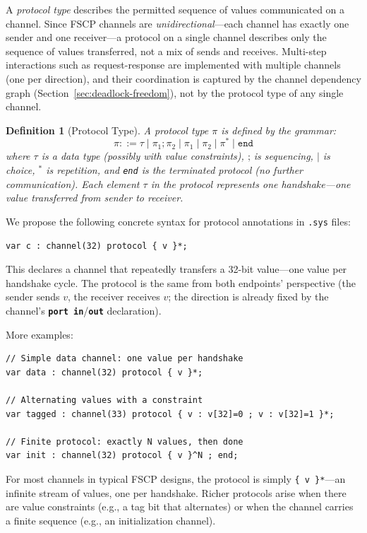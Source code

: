 \documentclass[11pt]{article}
\newcommand{\keyword}[1]{\texttt{\textbf{#1}}}
\newtheorem{definition}[theorem]{Definition}
\begin{document}
A \emph{protocol type} describes the permitted sequence of
values communicated on a channel.  Since FSCP channels are
\emph{unidirectional}---each channel has exactly one sender and one
receiver---a protocol on a single channel describes only the sequence
of values transferred, not a mix of sends and receives.  Multi-step
interactions such as request-response are implemented with multiple
channels (one per direction), and their coordination is captured by
the channel dependency graph (Section~\ref{sec:deadlock-freedom}),
not by the protocol type of any single channel.

\begin{definition}[Protocol Type]
\label{def:protocol}
A protocol type $\pi$ is defined by the grammar:
\[
\pi ::= \tau \mid
        \pi_1 \mathbin{;} \pi_2 \mid
        \pi_1 \mid \pi_2 \mid
        \pi^{*} \mid \texttt{end}
\]
where $\tau$ is a data type (possibly with value constraints),
$\mathbin{;}$ is sequencing, $\mid$ is choice, ${}^{*}$ is
repetition, and \texttt{end} is the terminated protocol (no further
communication).  Each element $\tau$ in the protocol represents one
handshake---one value transferred from sender to receiver.
\end{definition}

We propose the following concrete syntax for protocol annotations in
\texttt{.sys} files:

\begin{Verbatim}[samepage=true]
var c : channel(32) protocol { v }*;
\end{Verbatim}

This declares a channel that repeatedly transfers a 32-bit value---one
value per handshake cycle.  The protocol is the same from both
endpoints' perspective (the sender sends $v$, the receiver receives
$v$; the direction is already fixed by the channel's
\keyword{port}~\keyword{in}/\keyword{out} declaration).

More examples:

\begin{Verbatim}[samepage=true]
// Simple data channel: one value per handshake
var data : channel(32) protocol { v }*;

// Alternating values with a constraint
var tagged : channel(33) protocol { v : v[32]=0 ; v : v[32]=1 }*;

// Finite protocol: exactly N values, then done
var init : channel(32) protocol { v }^N ; end;
\end{Verbatim}

For most channels in typical FSCP designs, the protocol is simply
\texttt{\{ v \}*}---an infinite stream of values, one per handshake.
Richer protocols arise when there are value constraints (e.g., a
tag bit that alternates) or when the channel carries a finite
sequence (e.g., an initialization channel).
\end{document}
